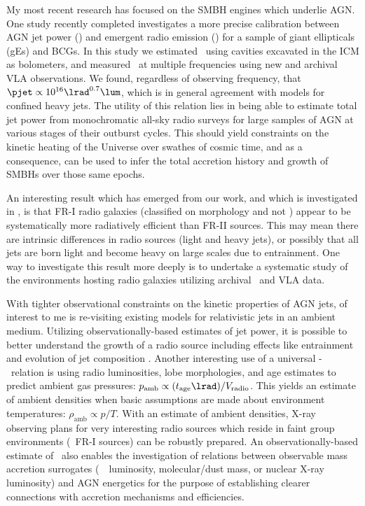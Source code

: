 \documentclass[12pt]{article}
\begin{document}
My most recent research has focused on the SMBH engines which underlie
AGN. One study recently completed \cite{pjet} investigates a more
precise calibration between AGN jet power (\pjet) and emergent radio
emission (\lrad) for a sample of giant ellipticals (gEs) and BCGs. In
this study we estimated \pjet\ using cavities excavated in the ICM as
bolometers, and measured \lrad\ at multiple frequencies using new and
archival VLA observations. We found, regardless of observing
frequency, that $\pjet \propto 10^{16} \lrad^{0.7} \lum$, which is in
general agreement with models for confined heavy jets. The utility of
this relation lies in being able to estimate total jet power from
monochromatic all-sky radio surveys for large samples of AGN at
various stages of their outburst cycles. This should yield constraints
on the kinetic heating of the Universe over swathes of cosmic time,
and as a consequence, can be used to infer the total accretion history
and growth of SMBHs over those same epochs.

An interesting result which has emerged from our work, and which is
investigated in \cite{2008MNRAS.386.1709C}, is that FR-I radio
galaxies (classified on morphology and not \lrad) appear to be
systematically more radiatively efficient than FR-II sources. This may
mean there are intrinsic differences in radio sources (light and heavy
jets), or possibly that all jets are born light and become heavy on
large scales due to entrainment. One way to investigate this result
more deeply is to undertake a systematic study of the environments
hosting radio galaxies utilizing archival \chandra\ and VLA data.

With tighter observational constraints on the kinetic properties of
AGN jets, of interest to me is re-visiting existing models for
relativistic jets in an ambient medium. Utilizing
observationally-based estimates of jet power, it is possible to better
understand the growth of a radio source including effects like
entrainment and evolution of jet composition \cite[\'a
la][]{1999MNRAS.309.1017W}. Another interesting use of a universal
\pjet-\lrad\ relation is using radio luminosities, lobe morphologies,
and age estimates to predict ambient gas pressures: $p_{\mathrm{amb}}
\propto (t_{\mathrm{age}}\lrad) / V_{\mathrm{radio}}$. This yields an
estimate of ambient densities when basic assumptions are made about
environment temperatures: $\rho_{\mathrm{amb}} \propto p/T$. With an
estimate of ambient densities, X-ray observing plans for very
interesting radio sources which reside in faint group environments
(\ie\ FR-I sources) can be robustly prepared. An observationally-based
estimate of \pjet\ also enables the investigation of relations between
observable mass accretion surrogates (\ie\ \halpha\ luminosity,
molecular/dust mass, or nuclear X-ray luminosity) and AGN energetics
for the purpose of establishing clearer connections with accretion
mechanisms and efficiencies.
\end{document}

